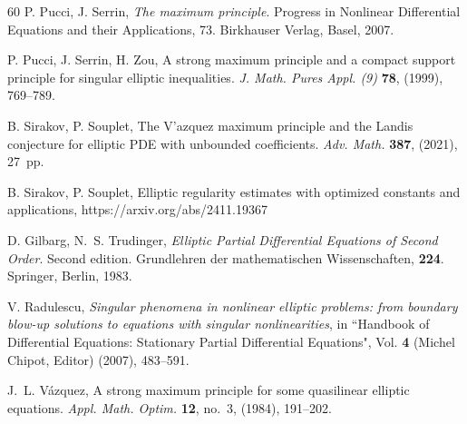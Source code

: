 \documentclass[12pt,a4paper]{amsart}
\numberwithin{equation}{section} %
\theoremstyle{definition}
\theoremstyle{remark}
\begin{document}
\begin{thebibliography}{60}
 {\sc P. Pucci, J. Serrin}, 
{\em The maximum principle}. 
Progress in Nonlinear Differential Equations and their Applications, 73. Birkhauser Verlag, Basel, 2007.
        
  {\sc P. Pucci, J. Serrin, H. Zou}, 
 { A strong maximum principle and a compact support principle for singular elliptic inequalities}. 
 {\em J. Math. Pures Appl. (9)} {\bf 78}, (1999), 769--789.

 {\sc B. Sirakov, P. Souplet}, { The V'azquez maximum principle and the Landis conjecture for elliptic PDE with unbounded coefficients}. {\em Adv. Math.} {\bf 387}, (2021), 27~pp.
    
  {\sc B. Sirakov, P. Souplet}, Elliptic regularity estimates with optimized constants and applications, https://arxiv.org/abs/2411.19367

 {\sc D. Gilbarg, N.~S. Trudinger}, 
{\em Elliptic Partial Differential Equations of Second Order}. 
Second edition. Grundlehren der mathematischen Wissenschaften, {\bf 224}. Springer, Berlin, 1983.

 {\sc V. Radulescu}, {\em Singular phenomena in
nonlinear elliptic problems: from boundary blow-up solutions to
equations with singular nonlinearities}, in ``Handbook of
Differential Equations: Stationary Partial Differential
Equations", Vol. {\bf 4} (Michel Chipot, Editor) (2007), 483--591.

 {\sc J.~L. V\'azquez}, 
{ A strong maximum principle for some quasilinear elliptic equations}. 
{\em Appl. Math. Optim.} {\bf 12}, no.~3, (1984), 191--202. 

\end{thebibliography}
\end{document}
